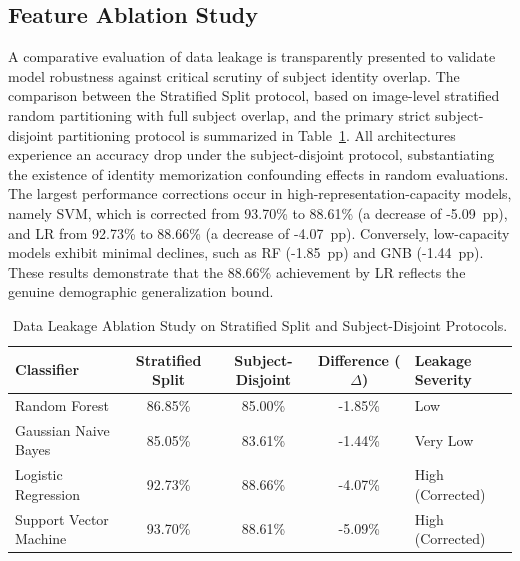 \subsection{Feature Ablation Study}
\label{sec:feature_ablation}
\label{sec:feature_ablation_study}

A comparative evaluation of data leakage is transparently presented to validate model robustness against critical scrutiny of subject identity overlap. The comparison between the Stratified Split protocol, based on image-level stratified random partitioning with full subject overlap, and the primary strict subject-disjoint partitioning protocol is summarized in Table~\ref{tab:XIII}. All architectures experience an accuracy drop under the subject-disjoint protocol, substantiating the existence of identity memorization confounding effects in random evaluations. The largest performance corrections occur in high-representation-capacity models, namely SVM, which is corrected from 93.70\% to 88.61\% (a decrease of -5.09~pp), and LR from 92.73\% to 88.66\% (a decrease of -4.07~pp). Conversely, low-capacity models exhibit minimal declines, such as RF (-1.85~pp) and GNB (-1.44~pp). These results demonstrate that the 88.66\% achievement by LR reflects the genuine demographic generalization bound.

\begin{table}[htbp]
\caption{Data Leakage Ablation Study on Stratified Split and Subject-Disjoint Protocols.}
\label{tab:13}
\label{tab:XIII}
\centering
\footnotesize
\setlength{\tabcolsep}{8pt}
\begin{tabular}{lcccl}
\toprule
\textbf{Classifier} & \textbf{Stratified Split} & \textbf{Subject-Disjoint} & \textbf{Difference ($\Delta$)} & \textbf{Leakage Severity} \\
\midrule
Random Forest & 86.85\% & 85.00\% & -1.85\% & Low \\
Gaussian Naive Bayes & 85.05\% & 83.61\% & -1.44\% & Very Low \\
Logistic Regression & 92.73\% & 88.66\% & -4.07\% & High (Corrected) \\
Support Vector Machine & 93.70\% & 88.61\% & -5.09\% & High (Corrected) \\
\bottomrule
\end{tabular}
\end{table}

